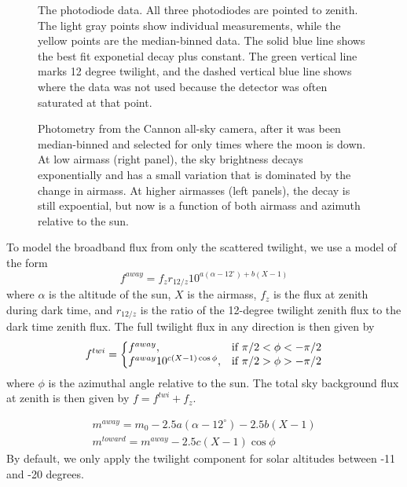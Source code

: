 \documentclass{emulateapj}  %
\begin{document}
{\begin{figure*}
  \caption{The photodiode data.  All three photodiodes are pointed to zenith. The light gray points show individual measurements, while the yellow points are the median-binned data. The solid blue line shows the best fit exponetial decay plus constant. The green vertical line marks 12 degree twilight, and the dashed vertical blue line shows where the data was not used because the detector was often saturated at that point. \label{diodePlot}}
\end{figure*}


\begin{figure*}
  \caption{Photometry from the Cannon all-sky camera, after it was been median-binned and selected for only times where the moon is down.  At low airmass (right panel), the sky brightness decays exponentially and has a small variation that is dominated by the change in airmass.  At higher airmasses (left panels), the decay is still expoential, but now is a function of both airmass and azimuth relative to the sun.}
\end{figure*}



To model the broadband flux from only the scattered twilight, we use a model of the form
\begin{equation}\label{eqn:twi1}
  f^{away} = f_{z} r_{12/z} 10^{a(\alpha-12^{\circ})+b(X-1)}
\end{equation}
where $\alpha$ is the altitude of the sun, $X$ is the airmass, $f_{z}$ is the flux at zenith during dark time, and $r_{12/z}$ is the ratio of the 12-degree twilight zenith flux to the dark time zenith flux. The full twilight flux in any direction is then given by
\begin{equation}
  \label{eqn:twi}
  f^{twi}  = \left\{
  \begin{array}{@{}ll@{}}
        f^{away}, & \text{if}\  \pi/2 < \phi < -\pi/2   \\
        f^{away} 10^{c (X-1) \cos{\phi}}, &  \text{if}\   \pi/2 > \phi >  -\pi/2
        \end{array} \right.
\end{equation}
where $\phi$ is the azimuthal angle relative to the sun. The total sky background flux at zenith is then given by $f = f^{twi} + f_{z}$.


\begin{eqnarray}
  m^{away} = m_0 -2.5a(\alpha-12^{\circ})-2.5b(X-1) \\
  m^{toward} = m^{away} -2.5c(X-1)\cos{\phi}
\end{eqnarray}
By default, we only apply the twilight component for solar altitudes between -11 and -20 degrees.


}
\end{document}
